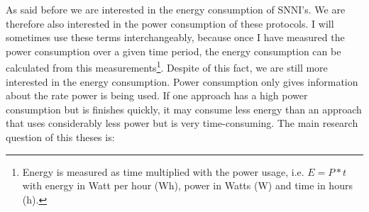 \documentclass[../thesis.tex]{subfiles}
\begin{document}


As said before we are interested in the energy consumption of SNNI's. We are therefore also interested in the power consumption of these protocols. I will sometimes use these terms interchangeably, because once I have measured the power consumption over a given time period, the energy consumption can be calculated from this measurements\footnote{Energy is measured as time multiplied with the power usage, i.e. $E=P*t$ with energy in Watt per hour (Wh), power in Watts (W) and time in hours (h).}. Despite of this fact, we are still more interested in the energy consumption. Power consumption only gives information about the rate power is being used. If one approach has a high power consumption but is finishes quickly, it may consume less energy than an approach that uses considerably less power but is very time-consuming. The main research question of this theses is:
\end{document}
